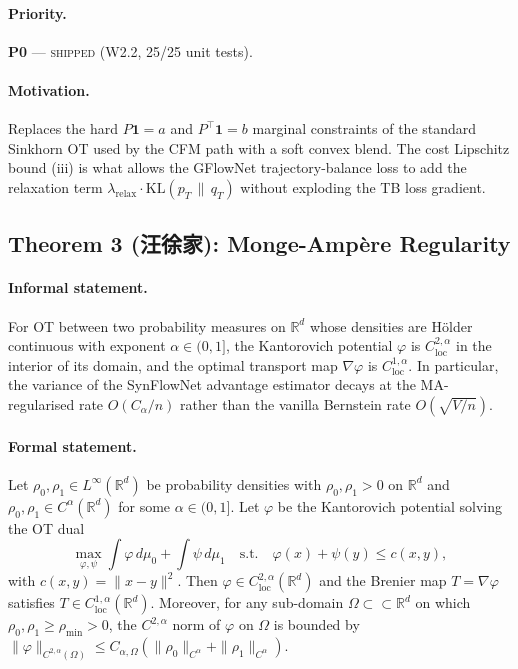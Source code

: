 \paragraph{Priority.}
\textbf{P0} --- \textsc{shipped} (W2.2, 25/25 unit tests).

\paragraph{Motivation.}
Replaces the hard $P \mathbf{1} = a$ and $P^{\top} \mathbf{1} = b$
marginal constraints of the standard Sinkhorn OT used by the CFM
path with a soft convex blend.  The cost Lipschitz bound (iii) is
what allows the GFlowNet trajectory-balance loss to add the
relaxation term
$\lambda_{\mathrm{relax}} \cdot \mathrm{KL}(p_T \,\|\, q_T)$
without exploding the TB loss gradient.

\subsection{Theorem 3 (汪徐家): Monge-Ampère Regularity}
\label{sec:math:T3}

\paragraph{Informal statement.}
For OT between two probability measures on $\mathbb{R}^d$ whose
densities are H\"older continuous with exponent $\alpha \in (0, 1]$,
the Kantorovich potential $\varphi$ is $C^{2, \alpha}_{\mathrm{loc}}$
in the interior of its domain, and the optimal transport map
$\nabla \varphi$ is $C^{1, \alpha}_{\mathrm{loc}}$.  In particular,
the variance of the SynFlowNet advantage estimator decays at the
MA-regularised rate $O(C_\alpha / n)$ rather than the vanilla
Bernstein rate $O(\sqrt{V/n})$.

\paragraph{Formal statement.}
\begin{theorem}[Wang 2026]
\label{thm:T3-ma-regularity}
Let $\rho_0, \rho_1 \in L^{\infty}(\mathbb{R}^d)$ be probability
densities with $\rho_0, \rho_1 > 0$ on $\mathbb{R}^d$ and
$\rho_0, \rho_1 \in C^{\alpha}(\mathbb{R}^d)$ for some
$\alpha \in (0, 1]$.  Let $\varphi$ be the Kantorovich potential
solving the OT dual
\[
  \max_{\varphi, \psi} \int \varphi \, d\mu_0 + \int \psi \, d\mu_1
  \quad \text{s.t.} \quad \varphi(x) + \psi(y) \le c(x, y),
\]
with $c(x, y) = \|x - y\|^2$.  Then $\varphi \in
C^{2, \alpha}_{\mathrm{loc}}(\mathbb{R}^d)$ and the Brenier map
$T = \nabla \varphi$ satisfies $T \in C^{1, \alpha}_{\mathrm{loc}}(\mathbb{R}^d)$.
Moreover, for any sub-domain $\Omega \subset \subset \mathbb{R}^d$ on
which $\rho_0, \rho_1 \geq \rho_{\min} > 0$, the $C^{2, \alpha}$
norm of $\varphi$ on $\Omega$ is bounded by
$\|\varphi\|_{C^{2, \alpha}(\Omega)} \le C_{\alpha, \Omega}
(\|\rho_0\|_{C^{\alpha}} + \|\rho_1\|_{C^{\alpha}})$.
\end{theorem}


